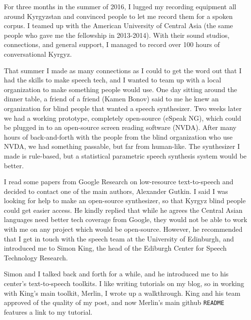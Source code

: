\documentclass[12pt,a4paper]{article}
\begin{document}
For three months in the summer of 2016, I lugged my recording equipment all around Kyrgyzstan and convinced people to let me record them for a spoken corpus. I teamed up with the American University of Central Asia (the same people who gave me the fellowship in 2013-2014). With their sound studios, connections, and general support, I managed to record over 100 hours of conversational Kyrgyz.

That summer I made as many connections as I could to get the word out that I had the skills to make speech tech, and I wanted to team up with a local organization to make something people would use. One day sitting around the dinner table, a friend of a friend (Kamen Bonov) said to me he knew an organization for blind people that wanted a speech synthesizer. Two weeks later we had a working prototype, completely open-source (eSpeak NG), which could be plugged in to an open-source screen reading software (NVDA). After many hours of back-and-forth with the people from the blind organization who use NVDA, we had something passable, but far from human-like. The synthesizer I made is rule-based, but a statistical parametric speech synthesis system would be better.

I read some papers from Google Research on low-resource text-to-speech and decided to contact one of the main authors, Alexander Gutkin. I said I was looking for help to make an open-source synthesizer, so that Kyrgyz blind people could get easier access. He kindly replied that while he agrees the Central Asian languages need better tech coverage from Google, they would not be able to work with me on any project which would be open-source. However, he recommended that I get in touch with the speech team at the University of Edinburgh, and introduced me to Simon King, the head of the Ediburgh Center for Speech Technology Research.

Simon and I talked back and forth for a while, and he introduced me to his center's text-to-speech toolkits. I like writing tutorials on my blog, so in working with King's main toolkit, Merlin, I wrote up a walkthrough. King and his team approved of the quality of my post, and now Merlin's main github \texttt{README} features a link to my tutorial.
\end{document}
